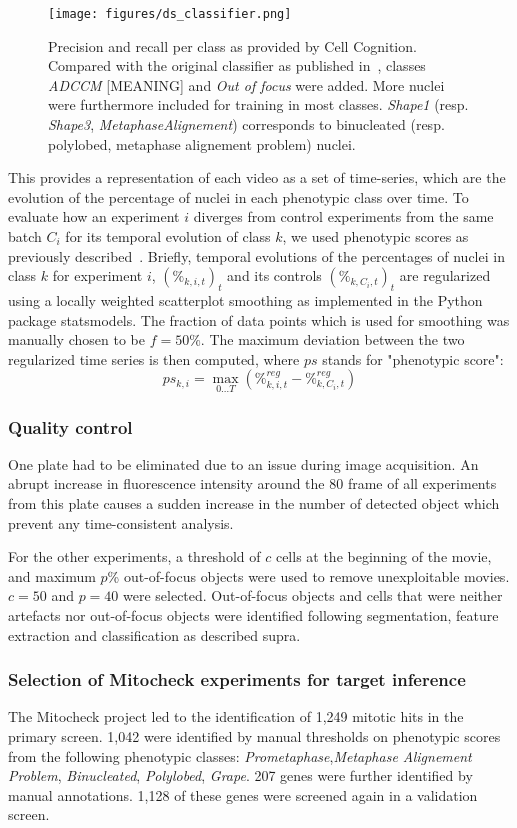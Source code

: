 \begin{figure*}[ht!]
\centerline{\texttt{[image: figures/ds\_classifier.png]}}
\caption{Precision and recall per class as provided by Cell Cognition. Compared with the original classifier as published in~\cite{Walter2010}, classes \textit{ADCCM} [MEANING] and \textit{Out of focus} were added. More nuclei were furthermore included for training in most classes. \textit{Shape1} (resp. \textit{Shape3}, \textit{MetaphaseAlignement}) corresponds to binucleated (resp. polylobed, metaphase alignement problem) nuclei.}
\label{ds_classifier}
\end{figure*}

This provides a representation of each video as a set of time-series, which are the evolution of the percentage of nuclei in each phenotypic class over time. To evaluate how an experiment $i$ diverges from  control experiments from the same batch $C_i$ for its temporal evolution of class $k$, we used phenotypic scores as previously described~\cite{Walter2010}. Briefly, temporal evolutions of the percentages of nuclei in class $k$ for experiment $i$, $(\%_{k,i,t})_t$ and its controls $(\%_{k,C_i,t})_t$ are regularized using a locally weighted scatterplot smoothing as implemented in the Python package statsmodels. The fraction of data points which is used for smoothing was manually chosen to be $f=50\%$. The maximum deviation between the two regularized time series is then computed, where $ps$ stands for "phenotypic score":
\[
ps_{k,i} = \max_{0\ldots T} (\%^{reg}_{k,i,t} - \%^{reg}_{k,C_i,t})
\]

\subsubsection{Quality control}
One plate had to be eliminated due to an issue during image acquisition. An abrupt increase in fluorescence intensity around the 80 frame of all experiments from this plate causes a sudden increase in the number of detected object which prevent any time-consistent analysis.

For the other experiments, a threshold of $c$ cells at the beginning of the movie, and maximum $p$\% out-of-focus objects were used to remove unexploitable movies. $c=50$ and $p=40$ were selected. Out-of-focus objects and cells that were neither artefacts nor out-of-focus objects were identified following segmentation, feature extraction and classification as described supra.

\subsubsection{Selection of Mitocheck experiments for target inference}
The Mitocheck project led to the identification of 1,249 mitotic hits in the primary screen. 1,042 were identified by manual thresholds on phenotypic scores from the following phenotypic classes: \textit{Prometaphase},\textit{Metaphase Alignement Problem}, \textit{Binucleated}, \textit{Polylobed}, \textit{Grape}. 207 genes were further identified by manual annotations. 1,128 of these genes were screened again in a validation screen.

